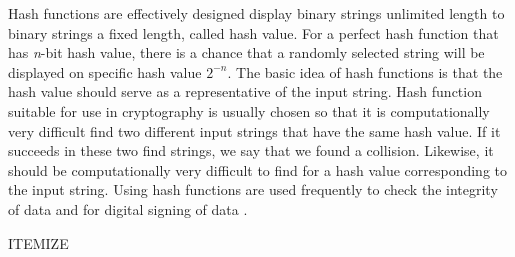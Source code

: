 \documentclass[
  digital, %
  notable,   %
  lof,     %
  lot,     %
]{fithesis3}
\begin{document}
Hash functions are effectively designed display binary strings unlimited length to binary 
strings a fixed length, called hash value. For a perfect hash function that has \textit{n}-bit 
hash value, there is a chance that a randomly selected string will be displayed on specific hash 
value $2^{-n}$. The basic idea of hash functions is that the hash value should serve as a 
representative of the input string. Hash function suitable for use in cryptography is usually 
chosen so that it is computationally very difficult find two different input strings that have 
the same hash value. If it succeeds in these two find strings, we say that we found a collision. 
Likewise, it should be computationally very difficult to find for a hash value corresponding to 
the input string. Using hash functions are used frequently to check the integrity of data and 
for digital signing of data \cite{piper2006kryptografie}.

ITEMIZE
\end{document}
